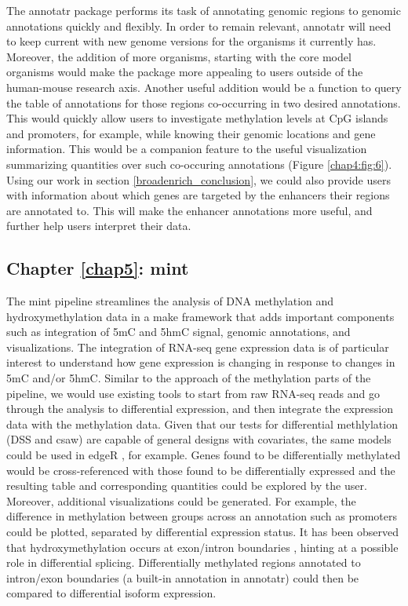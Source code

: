 The annotatr package performs its task of annotating genomic regions to genomic annotations quickly and flexibly. In order to remain relevant, annotatr will need to keep current with new genome versions for the organisms it currently has. Moreover, the addition of more organisms, starting with the core model organisms would make the package more appealing to users outside of the human-mouse research axis. Another useful addition would be a function to query the table of annotations for those regions co-occurring in two desired annotations. This would quickly allow users to investigate methylation levels at CpG islands and promoters, for example, while knowing their genomic locations and gene information. This would be a companion feature to the useful visualization summarizing quantities over such co-occuring annotations (Figure \ref{chap4:fig:6}). Using our work in section \ref{broadenrich_conclusion}, we could also provide users with information about which genes are targeted by the enhancers their regions are annotated to. This will make the enhancer annotations more useful, and further help users interpret their data.

\subsection{Chapter \ref{chap5}: mint}
\label{mint_conclusion}

The mint pipeline streamlines the analysis of DNA methylation and hydroxymethylation data in a make framework that adds important components such as integration of 5mC and 5hmC signal, genomic annotations, and visualizations. The integration of RNA-seq gene expression data is of particular interest to understand how gene expression is changing in response to changes in 5mC and/or 5hmC. Similar to the approach of the methylation parts of the pipeline, we would use existing tools to start from raw RNA-seq reads and go through the analysis to differential expression, and then integrate the expression data with the methylation data. Given that our tests for differential methlylation (DSS and csaw) are capable of general designs with covariates, the same models could be used in edgeR \cite{Robinson:2010cw}, for example. Genes found to be differentially methylated would be cross-referenced with those found to be differentially expressed and the resulting table and corresponding quantities could be explored by the user. Moreover, additional visualizations could be generated. For example, the difference in methylation between groups across an annotation such as promoters could be plotted, separated by differential expression status. It has been observed that hydroxymethylation occurs at exon/intron boundaries \cite{Ehrlich:2014hj}, hinting at a possible role in differential splicing. Differentially methylated regions annotated to intron/exon boundaries (a built-in annotation in annotatr) could then be compared to differential isoform expression.


